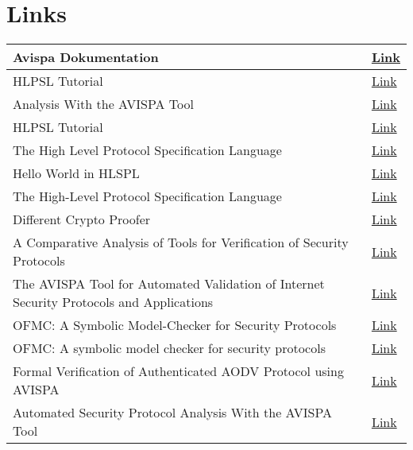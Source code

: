 \chapter{Links}
\begin{tabular}[center]{| p{10cm} | p{3cm} |}
\hline
Avispa Dokumentation & \href{http://avispa-project.org/package/user-manual.pdf}{Link} \\ \hline

HLPSL Tutorial & \href{http://avispa-project.org/package/tutorial.pdf}{Link} \\ \hline

Analysis With the AVISPA Tool & \href{http://www.avispa-project.org/papers/avispa-mfps21.pdf}{Link} \\ \hline

HLPSL Tutorial & \href{http://www.avispa-project.org/package/tutorial.pdf}{Link} \\ \hline

The High Level Protocol Specification Language & \href{https://docs.google.com/viewer?url=http\%3A\%2F\%2Fwww.avispa-project.org\%2Fdelivs\%2F2.1\%2Fd2-1.pdf}{Link} \\ \hline

Hello World in HLSPL & \href{http://www.doc.ic.ac.uk/~mrh/avispa/firstexample.pdf}{Link} \\ \hline

The High-Level Protocol Specification Language & \href{http://www.avispa-project.org/talks/appsem05-hlpsl.pdf}{Link} \\ \hline

Different Crypto Proofer & \href{http://www-verimag.imag.fr/~plafourc/teaching/Lecture_Note09/Lecture9_Javelle_Ripert_Wloka.pdf}{Link} \\ \hline

A Comparative Analysis of Tools for Verification of Security Protocols & \href{http://www.scirp.org/journal/PaperInformation.aspx?PaperID=2843#.VEZOhB93P7M}{Link} \\ \hline

The AVISPA Tool for Automated Validation of Internet Security Protocols and Applications & \href{http://www.inf.ethz.ch/personal/basin/pubs/avispa05.pdf}{Link} \\ \hline

OFMC: A Symbolic Model-Checker for Security Protocols & \href{https://www1.ethz.ch/infsec/research/publications/pub2004/OFMC_TR450.pdf}{Link} \\ \hline

OFMC: A symbolic model checker for security protocols & \href{http://www.avispa-project.org/papers/ofmc-jis05.pdf}{Link} \\ \hline

Formal Verification of Authenticated AODV Protocol using AVISPA & \href{http://research.ijcaonline.org/volume50/number19/pxc3881179.pdf}{Link} \\ \hline

Automated Security Protocol Analysis With the AVISPA Tool & \href{http://www.avispa-project.org/papers/avispa-mfps21.pdf}{Link} \\ \hline
\end{tabular}